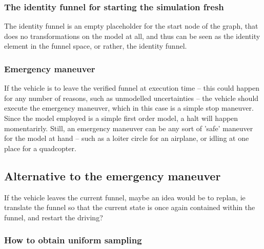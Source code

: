 \subsubsection{The identity funnel for starting the simulation fresh}

The identity funnel is an empty placeholder for the start node of the graph,
that does no transformations on the model at all, and thus can be seen as the
identity element in the funnel space, or rather, the identity funnel.

\subsubsection{Emergency maneuver}

If the vehicle is to leave the verified funnel at execution time -- this could
happen for any number of reasons, such as unmodelled uncertainties -- the
vehicle should execute the emergency maneuver, which in this case is a simple
stop maneuver. Since the model employed is a simple first order model, a halt
will happen momentarirly. Still, an emergency maneuver can be any sort of 'safe'
maneuver for the model at hand -- such as a loiter circle for an airplane, or
idling at one place for a quadcopter.


\subsection{Alternative to the emergency maneuver}

If the vehicle leaves the current funnel, maybe an idea would be to replan, ie
translate the funnel so that the current state is once again contained within
the funnel, and restart the driving?


\subsubsection{How to obtain uniform sampling}

